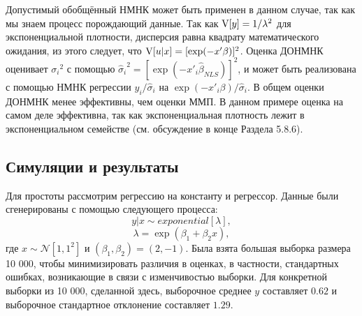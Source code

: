 Допустимый обобщённый НМНК может быть применен в данном случае, так как мы знаем процесс порождающий данные. Так как $\mathrm{V}[y]=1/\lambda^2$ для экспоненциальной плотности, дисперсия равна квадрату математического ожидания, из этого следует, что $\mathrm{V}[u|x]=[\exp(-x'\beta)]^2$. Оценка ДОНМНК оценивает ${\sigma_i}^2$ с помощью ${\hat{\sigma}_i}^2=[\exp(-x'_{i}\hat{\beta}_{NLS})]^2$, и может быть реализована с помощью НМНК регрессии $y_{i}/\hat{\sigma}_i$ на $\exp(-x'_{i}\beta)/\hat{\sigma}_i$. В общем оценки ДОНМНК менее эффективны, чем оценки ММП. В данном примере оценка на самом деле эффективна, так как экспоненциальная плотность лежит в экспоненциальном семействе (см. обсуждение в конце Раздела 5.8.6).

\subsection{Симуляции и результаты}

Для простоты рассмотрим регрессию на константу и регрессор. Данные были сгенерированы с помощью следующего процесса:
\[
y|x \sim exponential[\lambda],
\]
\[
\lambda=\exp(\beta_1 + \beta_2 x),
\]
где $x \sim \mathcal{N}[1,1^{2}]$ и $(\beta_1,\beta_2)=(2,-1)$. Была взята большая выборка размера 10 000, чтобы минимизировать различия в оценках, в частности, стандартных ошибках, возникающие в связи с изменчивостью выборки. Для конкретной выборки из 10 000, сделанной здесь, выборочное среднее $y$ составляет $0.62$ и выборочное стандартное отклонение составляет $1.29$.

